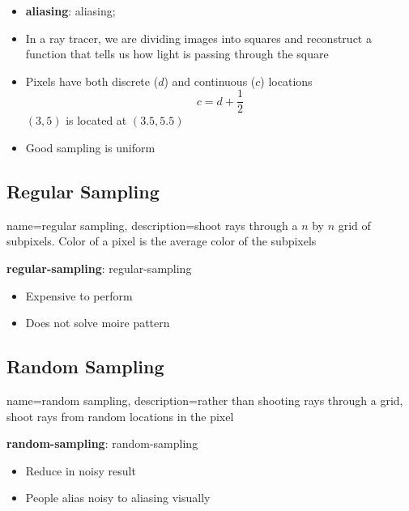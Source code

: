   \begin{itemize}
    \item \textbf{\Gls{aliasing}}: \Glsdesc{aliasing};
    \item In a ray tracer, we are dividing images into squares and reconstruct
    a function that tells us how light is passing through the square
    \item Pixels have both discrete ($ d $) and continuous ($ c $) locations
    \begin{equation}
      c = d + \frac{1}{2}
    \end{equation}
    $ \left( 3, 5 \right) $ is located at $ \left( 3.5, 5.5 \right) $

    \item Good sampling is uniform
  \end{itemize}

  \subsection{Regular Sampling}

    {
      name=regular sampling,
      description={shoot rays through a $ n $ by $ n $ grid of subpixels.
      Color of a pixel is the average color of the subpixels}
    }

    \textbf{\Gls{regular-sampling}}: \glsdesc{regular-sampling}

    \begin{itemize}
      \item Expensive to perform
      \item Does not solve moire pattern
    \end{itemize}

  \subsection{Random Sampling}

    {
      name=random sampling,
      description={rather than shooting rays through a grid, shoot rays from
      random locations in the pixel}
    }

    \textbf{\Gls{random-sampling}}: \glsdesc{random-sampling}

    \begin{itemize}
      \item Reduce in noisy result
      \item People alias noisy to aliasing visually
    \end{itemize}

